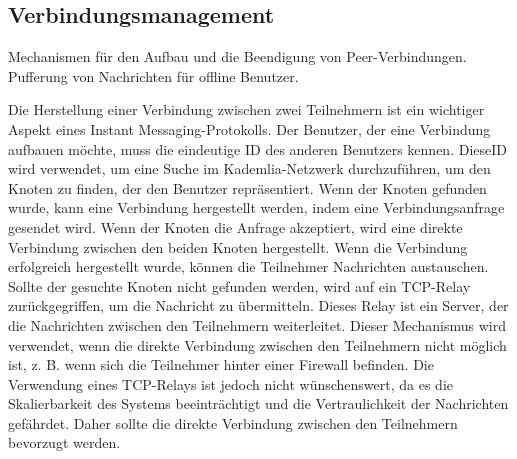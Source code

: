 \subsection{Verbindungsmanagement}

Mechanismen für den Aufbau und die Beendigung von Peer-Verbindungen. Pufferung von Nachrichten für offline Benutzer.

Die Herstellung einer Verbindung zwischen zwei Teilnehmern ist ein wichtiger Aspekt eines Instant Messaging-Protokolls. Der Benutzer, der eine Verbindung aufbauen möchte, muss die eindeutige ID des anderen Benutzers kennen. DieseID wird verwendet, um eine Suche im Kademlia-Netzwerk durchzuführen, um den Knoten zu finden, der den Benutzer repräsentiert. Wenn der Knoten gefunden wurde, kann eine Verbindung hergestellt werden, indem eine Verbindungsanfrage gesendet wird. Wenn der Knoten die Anfrage akzeptiert, wird eine direkte Verbindung zwischen den beiden Knoten hergestellt. Wenn die Verbindung erfolgreich hergestellt wurde, können die Teilnehmer Nachrichten austauschen. Sollte der gesuchte Knoten nicht gefunden werden, wird auf ein TCP-Relay zurückgegriffen, um die Nachricht zu übermitteln. Dieses Relay ist ein Server, der die Nachrichten zwischen den Teilnehmern weiterleitet. Dieser Mechanismus wird verwendet, wenn die direkte Verbindung zwischen den Teilnehmern nicht möglich ist, z. B. wenn sich die Teilnehmer hinter einer Firewall befinden. Die Verwendung eines TCP-Relays ist jedoch nicht wünschenswert, da es die Skalierbarkeit des Systems beeinträchtigt und die Vertraulichkeit der Nachrichten gefährdet. Daher sollte die direkte Verbindung zwischen den Teilnehmern bevorzugt werden.

